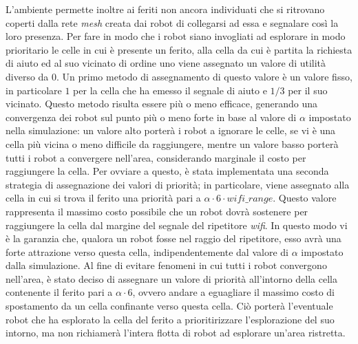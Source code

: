 L'ambiente permette inoltre ai feriti non ancora individuati che si ritrovano coperti dalla rete \textit{mesh} creata dai robot di collegarsi ad essa e segnalare così la loro presenza. Per fare in modo che i robot siano invogliati ad esplorare in modo prioritario le celle in cui è presente un ferito, alla cella da cui è partita la richiesta di aiuto ed al suo vicinato di ordine uno viene assegnato un valore di utilità diverso da $0$. Un primo metodo di assegnamento di questo valore è un valore fisso, in particolare $1$ per la cella che ha emesso il segnale di aiuto e $1/3$ per il suo vicinato. Questo metodo risulta essere più o meno efficace, generando una convergenza dei robot sul punto più o meno forte in base al valore di $\alpha$ impostato nella simulazione: un valore alto porterà i robot a ignorare le celle, se vi è una cella più vicina o meno difficile da raggiungere, mentre un valore basso porterà tutti i robot a convergere nell'area, considerando marginale il costo per raggiungere la cella. Per ovviare a questo, è stata implementata una seconda strategia di assegnazione dei valori di priorità; in particolare, viene assegnato alla cella in cui si trova il ferito una priorità pari a 
$\alpha \cdot 6 \cdot wifi\_range$. Questo valore rappresenta il massimo costo possibile che un robot dovrà sostenere per raggiungere la cella dal margine del segnale del ripetitore \textit{wifi}. In questo modo vi è la garanzia che, qualora un robot fosse nel raggio del ripetitore, esso avrà una forte attrazione verso questa cella, indipendentemente dal valore di $\alpha$ impostato dalla simulazione. Al fine di evitare fenomeni in cui tutti i robot convergono nell'area, è stato deciso di assegnare un valore di priorità all'intorno della cella contenente il ferito pari a $\alpha \cdot 6$, ovvero andare a eguagliare il massimo costo di spostamento da un cella confinante verso questa cella. Ciò porterà l'eventuale robot che ha esplorato la cella del ferito a prioritirizzare l'esplorazione del suo intorno, ma non richiamerà l'intera flotta di robot ad esplorare un'area ristretta.
